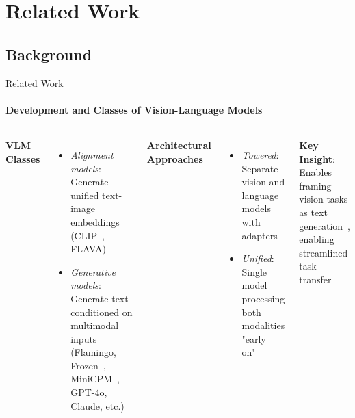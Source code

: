 \documentclass[aspectratio=169]{beamer}
\newcommand\customcolumnwidth{0.4625\textwidth}
\begin{document}
\section{Related Work}
\subsection{Background}
\begin{frame}{Related Work}
\framesubtitle{Development and Classes of Vision-Language Models}
  \vspace{-1em}
  \begin{columns}[T]
    \column{\customcolumnwidth}
    \textbf{VLM Classes}
    \vspace{-0.4em}
    \begin{itemize}
      \item \emph{Alignment models}: Generate unified text-image embeddings (CLIP~, FLAVA) \vspace{-0.2em}
      \item \emph{Generative models}: Generate text conditioned on multimodal inputs (Flamingo, Frozen~, MiniCPM~, GPT-4o, Claude, etc.)
    \end{itemize}
    \column{\customcolumnwidth}
    \textbf{Architectural Approaches}
    \vspace{-0.4em}
    \begin{itemize}
      \item \emph{Towered}: Separate vision and language models with adapters
      \item \emph{Unified}: Single model processing both modalities "early on"~
    \end{itemize}
    \textbf{Key Insight}: Enables framing vision tasks as text generation~, enabling streamlined task transfer
  \end{columns}
\end{frame}
\end{document}
